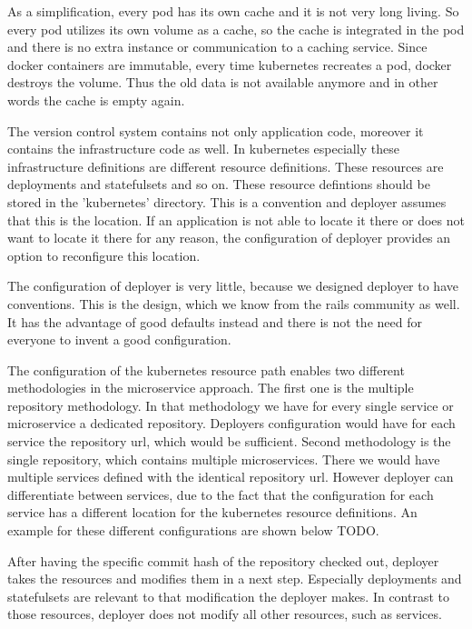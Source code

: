 As a simplification, every pod has its own cache and it is not very long living. So every
pod utilizes its own volume as a cache, so the cache is integrated in the pod and there is
no extra instance or communication to a caching service. Since docker containers are
immutable, every time kubernetes recreates a pod, docker destroys the volume. Thus the old
data is not available anymore and in other words the cache is empty again.

The version control system contains not only application code, moreover it contains the
infrastructure code as well. In kubernetes especially these infrastructure definitions are
different resource definitions. These resources are deployments and statefulsets and so
on. These resource defintions should be stored in the 'kubernetes' directory. This is a
convention and deployer assumes that this is the location. If an application is not able
to locate it there or does not want to locate it there for any reason, the configuration
of deployer provides an option to reconfigure this location.

The configuration of deployer is very little, because we designed deployer to have
conventions. This is the design, which we know from the rails community as well. It has
the advantage of good defaults instead and there is not the need for everyone to invent a
good configuration.

The configuration of the kubernetes resource path enables two different methodologies in
the microservice approach. The first one is the multiple repository methodology. In that
methodology we have for every single service or microservice a dedicated repository.
Deployers configuration would have for each service the repository url, which would be
sufficient. Second methodology is the single repository, which contains multiple
microservices. There we would have multiple services defined with the identical repository
url. However deployer can differentiate between services, due to the fact that the
configuration for each service has a different location for the kubernetes resource
definitions. An example for these different configurations are shown below TODO.

After having the specific commit hash of the repository checked out, deployer takes the
resources and modifies them in a next step. Especially deployments and statefulsets are
relevant to that modification the deployer makes. In contrast to those resources, deployer
does not modify all other resources, such as services.

